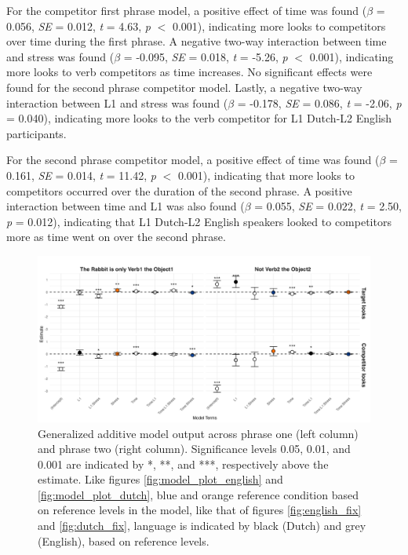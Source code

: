 For the competitor first phrase model, a positive effect of time was found ($\beta$ = 0.056, \textit{SE} = 0.012, \textit{t} = 4.63, \textit{p} $<$ 0.001), indicating more looks to competitors over time during the first phrase. A negative two-way interaction between time and stress was found ($\beta$ = -0.095, \textit{SE} = 0.018, \textit{t} = -5.26, \textit{p} $<$ 0.001), indicating more looks to verb competitors as time increases. No significant effects were found for the second phrase competitor model. Lastly, a negative two-way interaction between L1 and stress was found ($\beta$ = -0.178, \textit{SE} = 0.086, \textit{t} = -2.06, \textit{p} = 0.040), indicating more looks to the verb competitor for L1 Dutch-L2 English participants.

For the second phrase competitor model, a positive effect of time was found ($\beta$ = 0.161, \textit{SE} = 0.014, \textit{t} = 11.42, \textit{p} $<$ 0.001), indicating that more looks to competitors occurred over the duration of the second phrase. A positive interaction between time and L1 was also found ($\beta$ = 0.055, \textit{SE} = 0.022, \textit{t} = 2.50, \textit{p} = 0.012), indicating that L1 Dutch-L2 English speakers looked to competitors more as time went on over the second phrase. 

\begin{figure}[H]  %
    \centering
    \includegraphics[width=\textwidth,height=\textheight,keepaspectratio]{viz/gam_mod_out.png}
    \caption{Generalized additive model output across phrase one (left column) and phrase two (right column). Significance levels 0.05, 0.01, and 0.001 are indicated by *, **, and ***, respectively above the estimate. Like figures \ref{fig:model_plot_english} and \ref{fig:model_plot_dutch}, blue and orange reference condition based on reference levels in the model, like that of figures \ref{fig:english_fix} and \ref{fig:dutch_fix}, language is indicated by black (Dutch) and grey (English), based on reference levels.}
    \label{fig:gam_mod_out}
\end{figure}

